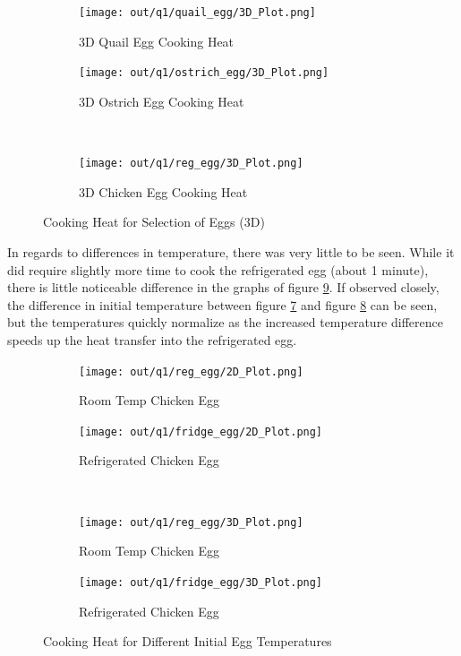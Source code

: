 \documentclass[12pt]{article}
\begin{document}
\begin{figure}[H]
    \centering
    \begin{subfigure}[]{0.48\textwidth}
        \centering
        \texttt{[image: out/q1/quail\_egg/3D\_Plot.png]}
        \caption{3D Quail Egg Cooking Heat}
        \label{fig:q1_3d_egg_quail}
    \end{subfigure}
    \begin{subfigure}[]{0.48\textwidth}
        \centering
        \texttt{[image: out/q1/ostrich\_egg/3D\_Plot.png]}
        \caption{3D Ostrich Egg Cooking Heat}
        \label{fig:q1_3d_egg_Ostrich}
    \end{subfigure}
    \\
    \begin{subfigure}[]{0.75\textwidth}
        \centering
        \texttt{[image: out/q1/reg\_egg/3D\_Plot.png]}
        \caption{3D Chicken Egg Cooking Heat}
        \label{fig:q1_3d_egg_chicken}
    \end{subfigure}
    \caption{Cooking Heat for Selection of Eggs (3D)}
    \label{fig:q1_3d_eggs}
\end{figure}

\clearpage
In regards to differences in temperature, there was very little to be seen. While it did require slightly more time to cook the refrigerated egg (about 1 minute), there is little noticeable difference in the graphs of figure \ref{fig:q1_temps}. If observed closely, the difference in initial temperature between figure \ref{fig:q1_temps_3d_reg} and figure \ref{fig:q1_temps_3d_fridge} can be seen, but the temperatures quickly normalize as the increased temperature difference speeds up the heat transfer into the refrigerated egg.

\begin{figure}[H]
    \centering
    \begin{subfigure}[]{0.48\textwidth}
        \centering
        \texttt{[image: out/q1/reg\_egg/2D\_Plot.png]}
        \caption{Room Temp Chicken Egg}
        \label{fig:q1_temps_2d_reg}
    \end{subfigure}
    \begin{subfigure}[]{0.48\textwidth}
        \centering
        \texttt{[image: out/q1/fridge\_egg/2D\_Plot.png]}
        \caption{Refrigerated Chicken Egg}
        \label{fig:q1_temps_2d_fridge}
    \end{subfigure}
    \\
    \begin{subfigure}[]{0.48\textwidth}
        \centering
        \texttt{[image: out/q1/reg\_egg/3D\_Plot.png]}
        \caption{Room Temp Chicken Egg}
        \label{fig:q1_temps_3d_reg}
    \end{subfigure}
    \begin{subfigure}[]{0.48\textwidth}
        \centering
        \texttt{[image: out/q1/fridge\_egg/3D\_Plot.png]}
        \caption{Refrigerated Chicken Egg}
        \label{fig:q1_temps_3d_fridge}
    \end{subfigure}
    \caption{Cooking Heat for Different Initial Egg Temperatures}
    \label{fig:q1_temps}
\end{figure}
\end{document}

